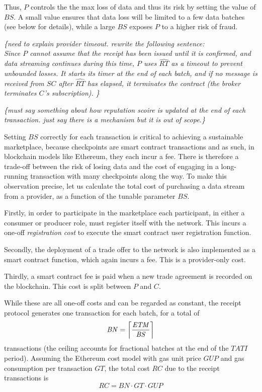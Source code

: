 \documentclass[letterpaper, 10 pt, conference]{ieeeconf}  %
\DeclarePairedDelimiter{\ceil}{\lceil}{\rceil}
\newcommand{\mynote}[1]{{\leavevmode\smaller\itshape\color{red}\{#1\}}}
\newcommand{\bs}{\ensuremath{\mathit{BS}}}
\newcommand{\tati}{\ensuremath{\mathit{TATI}}}
\newcommand{\etm}{\ensuremath{\mathit{ETM}}}
\newcommand{\bn}{\ensuremath{\mathit{BN}}}
\newcommand{\smartc}{\ensuremath{\mathit{SC}}}
\newcommand{\rtEst}{\ensuremath{\widehat{\mathit{RT}}}}
\newcommand{\gt}{\ensuremath{\mathit{GT}}}
\newcommand{\rc}{\ensuremath{\mathit{RC}}}   %
\newcommand{\gup}{\ensuremath{\mathit{GUP}}}
\begin{document}
Thus,  $P$ controls the the max loss of data and thus its risk by setting the value of \bs.
A small value ensures that data loss will be limited to a few data batches (see below for details), while a large \bs{} exposes $P$ to a higher risk of fraud.

\mynote{need to explain provider timeout. rewrite the following sentence: \\
Since $P$ cannot assume that the receipt has been issued until it is confirmed, and data streaming continues during this time, $P$ uses \rtEst{} as a timeout to prevent unbounded losses.
It starts its timer at the end of each batch, and if no message is received from \smartc{} after \rtEst{} has elapsed, it terminates the contract (the broker terminates $C$'s subscription).
}

\mynote{must say something about how reputation scoire is updated at the end of each transaction. just say there is a mechanism but it is out of scope.}



Setting \bs{} correctly for each transaction is critical to achieving a sustainable marketplace, because checkpoints are smart contract transactions and as such, in blockchain models like Ethereum, they each incur a fee. There is therefore a trade-off between the risk of losing data and the cost of engaging in a long-running transaction with many checkpoints along the way.
To make this observation precise, let us calculate the total cost of purchasing a data stream from a provider, as a function of the tunable parameter \bs.

Firstly, in order to participate in the marketplace each participant, in either a consumer or producer role, must register itself with the network. 
This incurs a one-off \textit{registration cost} to execute the smart contract user registration function.

Secondly, the deployment of a trade offer to the network is also implemented as a smart contract function, which again incurs a fee. This is a provider-only cost.

Thirdly, a smart contract fee is paid when a new trade agreement is recorded on the blockchain. This cost is split between $P$ and $C$.
%

While these are all one-off costs and can be regarded as constant, the receipt protocol generates one transaction for each batch, for a total of 
\[\bn = \ceil[\bigg] {\frac{\etm}{\bs}} \]
transactions (the ceiling accounts for fractional batches at the end of the \tati{} period). 
Assuming the Ethereum cost model with gas unit price \gup{} and gas consumption per transaction \gt, the total cost \rc{} due to the receipt transactions is 
\[\rc = \bn \cdot  \gt \cdot \gup    \] \label{RC}
\end{document}
